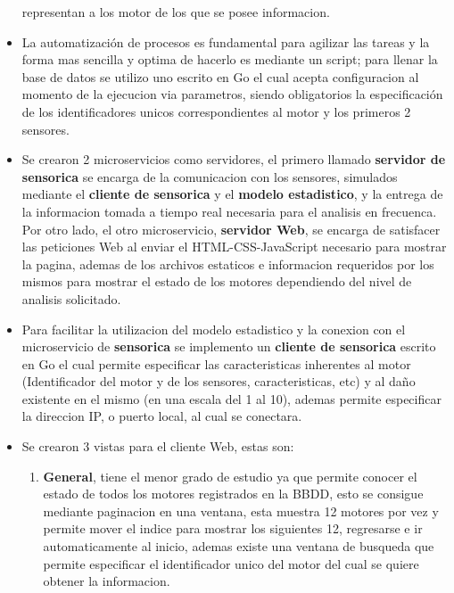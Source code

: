 \begin{itemize}
        representan a los motor de los que se posee informacion.
    \item La automatización de procesos es fundamental para agilizar las tareas y
        la forma mas sencilla y optima de hacerlo es mediante un script; para
        llenar la base de datos se utilizo uno escrito en Go el cual acepta
        configuracion al momento de la ejecucion via parametros, siendo obligatorios
        la especificación de los identificadores unicos correspondientes al motor
        y los primeros 2 sensores.
    \item Se crearon 2 microservicios como servidores, el primero llamado
        \textbf{servidor de sensorica}
        se encarga de la comunicacion con los sensores, simulados mediante el
        \textbf{cliente de sensorica} y el \textbf{modelo estadistico}, y la
        entrega de la informacion tomada a tiempo real necesaria para el analisis
        en frecuenca. Por otro lado, el otro microservicio, \textbf{servidor Web},
        se encarga de satisfacer las peticiones Web al enviar el HTML-CSS-JavaScript
        necesario para mostrar la pagina, ademas de los archivos estaticos e
        informacion requeridos por los mismos para mostrar el estado de los motores
        dependiendo del nivel de analisis solicitado.
    \item Para facilitar la utilizacion del modelo estadistico y la conexion con
        el microservicio de \textbf{sensorica} se implemento un \textbf{cliente de
        sensorica} escrito en Go el cual permite especificar las caracteristicas
        inherentes al motor (Identificador del motor y de los sensores, caracteristicas, etc)
        y al daño existente en el mismo (en una escala del 1 al 10), ademas permite
        especificar la direccion IP, o puerto local, al cual se conectara.
    \item Se crearon 3 vistas para el cliente Web, estas son:
        \begin{enumerate}
            \item \textbf{General},
                tiene el menor grado de estudio ya que permite conocer el estado de todos
                los motores registrados en la BBDD, esto se consigue mediante paginacion
                en una ventana, esta muestra 12 motores por vez y permite mover el indice
                para mostrar los siguientes 12, regresarse e ir automaticamente al inicio,
                ademas existe una ventana de busqueda que permite especificar el identificador
                unico del motor del cual se quiere obtener la informacion.

\end{enumerate}
\end{itemize}
